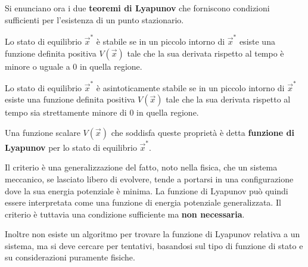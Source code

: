 \noindent Si enunciano ora i due \textbf{teoremi di Lyapunov} che forniscono condizioni sufficienti per l'esistenza di un punto stazionario.

\begin{thm}
	Lo stato di equilibrio $\vec{x}^*$ è stabile se in un piccolo intorno di $\vec{x}^*$ esiste una funzione definita positiva $V(\vec{x})$ tale che la sua derivata rispetto al tempo è minore o uguale a 0 in quella regione.
\end{thm}

\begin{thm}
	Lo stato di equilibrio $\vec{x}^*$ è asintoticamente stabile se in un piccolo intorno di $\vec{x}^*$ esiste una funzione definita positiva $V(\vec{x})$ tale che la sua derivata rispetto al tempo sia strettamente minore di 0 in quella regione.
\end{thm}

\noindent Una funzione scalare $V(\vec{x})$ che soddisfa queste proprietà è detta \textbf{funzione di Lyapunov} per lo stato di equilibrio $\vec{x}^*$.

Il criterio è una generalizzazione del fatto, noto nella fisica, che un sistema meccanico, se lasciato libero di evolvere, tende a portarsi in una configurazione dove la sua energia potenziale è minima. La funzione di Lyapunov può quindi essere interpretata come una funzione di energia potenziale generalizzata. Il criterio è tuttavia una condizione sufficiente ma \textbf{non necessaria}.

Inoltre non esiste un algoritmo per trovare la funzione di Lyapunov relativa a un sistema, ma si deve cercare per tentativi, basandosi sul tipo di funzione di stato e su considerazioni puramente fisiche.